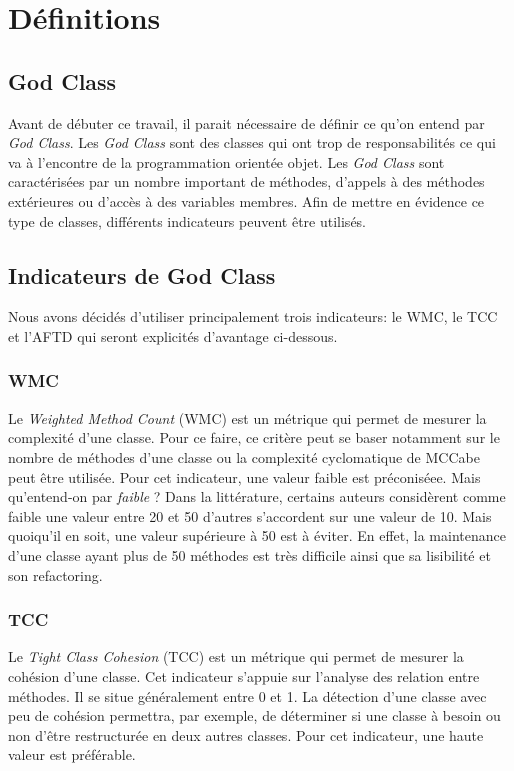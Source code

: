 \documentclass[11pt]{report}
\begin{document}


\tableofcontents


\chapter{Définitions}

	\section{God Class}
	Avant de débuter ce travail, il parait nécessaire de définir ce qu'on entend par \textit{God Class}. Les \textit{God Class} sont des classes qui ont trop de responsabilités ce qui va à l'encontre de la programmation orientée objet. Les \textit{God Class} sont caractérisées par un nombre important de méthodes, d'appels à des méthodes extérieures ou d'accès à des variables membres. Afin de mettre en évidence ce type de classes, différents indicateurs peuvent être utilisés. 
	
	\section{Indicateurs de God Class}
	Nous avons décidés d'utiliser principalement trois indicateurs: le WMC, le TCC et l'AFTD qui seront explicités d'avantage ci-dessous.   
		
		\subsection{WMC}
		Le \textit{Weighted Method Count} (WMC) est un métrique qui permet de mesurer la complexité d'une classe. Pour ce faire, ce critère peut se baser notamment sur le nombre de méthodes d'une classe ou  la complexité cyclomatique de MCCabe peut être utilisée. Pour cet indicateur, une valeur faible est préconiséee. Mais qu'entend-on par \textit{faible} ? Dans la littérature, certains auteurs considèrent comme faible une valeur entre 20 et 50 d'autres s'accordent sur une valeur de 10. Mais quoiqu'il en soit, une valeur supérieure à 50 est à éviter. En effet, la maintenance d'une classe ayant plus de 50 méthodes est très difficile ainsi que sa lisibilité et son refactoring.   
		
		\subsection{TCC}
		Le \textit{Tight Class Cohesion} (TCC) est un métrique qui permet de mesurer la cohésion d'une classe. Cet indicateur s'appuie sur l'analyse des relation entre méthodes. Il se situe généralement entre 0 et 1. La détection d'une classe avec peu de cohésion permettra, par exemple, de déterminer si une classe à besoin ou non d'être restructurée en deux autres classes.  Pour cet indicateur, une haute valeur est préférable.  
		
\end{document}
